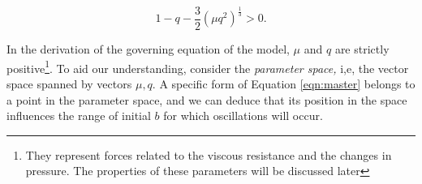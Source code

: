 \documentclass{article}
\begin{document}
\begin{equation}
    1 - q - \frac{3}{2}(\mu q^2)^{\frac{1}{3}} > 0.
\end{equation}

In the derivation of the governing equation of the model, $\mu$ and $q$ are strictly positive\footnote{They represent forces related to the viscous resistance and the changes in pressure. The properties of these parameters will be discussed later}.
To aid our understanding, consider the \textit{parameter space,} i,e, the vector space spanned by vectors $\mu, q$.
A specific form of Equation \ref{eqn:master} belongs to a point in the parameter space,
and we can deduce that its position in the space influences the range of initial $b$ for which oscillations will occur. 






\end{document}
